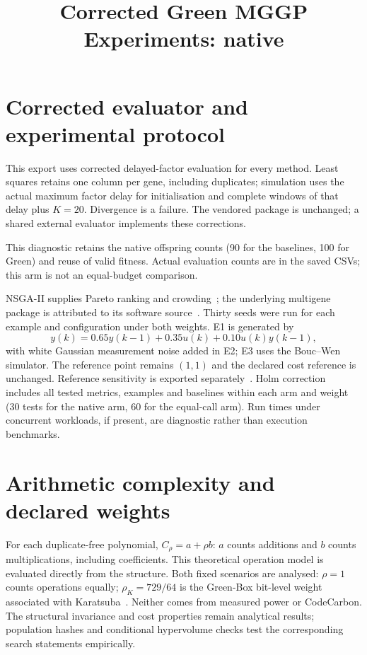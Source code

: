 \documentclass[11pt,a4paper]{article}
\theoremstyle{definition}
\theoremstyle{plain}
\theoremstyle{remark}
\begin{document}
\title{Corrected Green MGGP Experiments: native}
\author{}\date{}\maketitle

\section{Corrected evaluator and experimental protocol}
\noindent This export uses corrected delayed-factor evaluation for every method. Least squares retains one column per gene, including duplicates; simulation uses the actual maximum factor delay for initialisation and complete windows of that delay plus $K=20$. Divergence is a failure. The vendored package is unchanged; a shared external evaluator implements these corrections.

This diagnostic retains the native offspring counts (90 for the baselines, 100 for Green) and reuse of valid fitness. Actual evaluation counts are in the saved CSVs; this arm is not an equal-budget comparison.

NSGA-II supplies Pareto ranking and crowding~\cite{DPAM2002}; the underlying multigene package is attributed to its software source~\cite{mggpy}. Thirty seeds were run for each example and configuration under both weights. E1 is generated by
\begin{equation}y(k)=0.65y(k-1)+0.35u(k)+0.10u(k)y(k-1),\label{eq:tutorial}\end{equation}
with white Gaussian measurement noise added in E2; E3 uses the Bouc--Wen simulator. The reference point remains $(1,1)$ and the declared cost reference is unchanged. Reference sensitivity is exported separately~\cite{Ishibuchi2018}. Holm correction includes all tested metrics, examples and baselines within each arm and weight (30 tests for the native arm, 60 for the equal-call arm). Run times under concurrent workloads, if present, are diagnostic rather than execution benchmarks.

\section{Arithmetic complexity and declared weights}
For each duplicate-free polynomial, $C_\rho=a+\rho b$: $a$ counts additions and $b$ counts multiplications, including coefficients. This theoretical operation model is evaluated directly from the structure. Both fixed scenarios are analysed: $\rho=1$ counts operations equally; $\rho_K=729/64$ is the Green-Box bit-level weight associated with Karatsuba~\cite{NMN2023,KO1963}. Neither comes from measured power or CodeCarbon. The structural invariance and cost properties remain analytical results; population hashes and conditional hypervolume checks test the corresponding search statements empirically.
\end{document}
